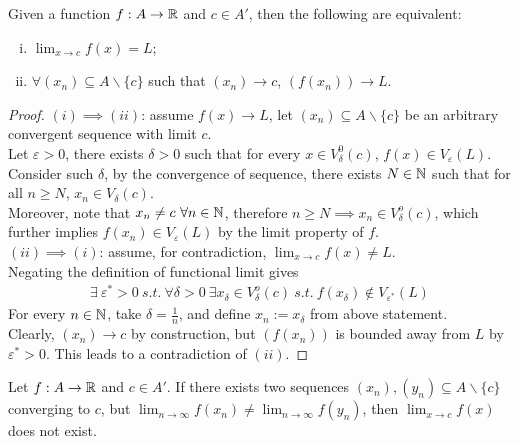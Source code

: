 \documentclass[11pt]{article}
\begin{document}
	\begin{theorem}
		Given a function $f: A \to \mathbb{R}$ and $c \in A'$, then the following are equivalent:
		\begin{enumerate}[(i)]
			\item $\lim_{x \to c} f(x) = L$;
			\item $\forall (x_n) \subseteq A \backslash \{c\}$ such that $(x_n) \to c$, $(f(x_n)) \to L$.
		\end{enumerate}
	\end{theorem}
	
	\begin{proof}
		$(i) \implies (ii)$: assume $f(x) \to L$, let $(x_n) \subseteq A \backslash \{c\}$ be an arbitrary convergent sequence with limit $c$. \\
		Let $\varepsilon > 0$, there exists $\delta > 0$ such that for every $x \in V_\delta^0(c)$, $f(x) \in V_\varepsilon(L)$.\\
		Consider such $\delta$, by the convergence of sequence, there exists $N \in \mathbb{N}$ such that for all $n \geq N$, $x_n \in V_\delta(c)$.\\
		Moreover, note that $x_n \neq c\ \forall n \in \mathbb{N}$, therefore $n \geq N \implies x_n \in V_\delta^o(c)$, which further implies $f(x_n) \in V_\varepsilon(L)$ by the limit property of $f$. \\
		$(ii) \implies (i)$: assume, for contradiction, $\lim_{x \to c} f(x) \neq L$.\\
		Negating the definition of functional limit gives
		\begin{align}
			\exists\ \varepsilon^* > 0\ s.t.\ \forall \delta > 0\ \exists x_\delta \in V_\delta^o(c)\ s.t.\ f(x_\delta) \notin V_{\varepsilon^*}(L)
		\end{align}
		For every $n \in \mathbb{N}$, take $\delta = \frac{1}{n}$, and define $x_n := x_\delta$ from above statement.\\
		Clearly, $(x_n) \to c$ by construction, but $(f(x_n))$ is bounded away from $L$ by $\varepsilon^* > 0$. This leads to a contradiction of $(ii)$.
	\end{proof}
	
	\begin{theorem}
		Let $f: A \to \mathbb{R}$ and $c \in A'$. If there exists two sequences $(x_n), (y_n) \subseteq A \backslash \{c\}$ converging to $c$, but $\lim_{n\to\infty} f(x_n) \neq \lim_{n\to\infty} f(y_n)$, then $\lim_{x \to c} f(x)$ does not exist.
	\end{theorem}
	
\end{document}
